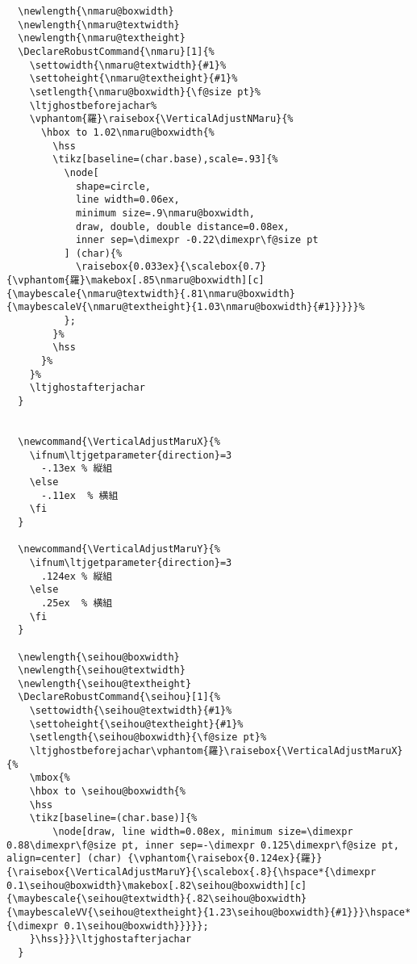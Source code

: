 \documentclass[luatex,fontsize=10pt,paper=b5,twoside]{jlreq}%
\begin{document}
\begin{lstlisting}
  \newlength{\nmaru@boxwidth}
  \newlength{\nmaru@textwidth}
  \newlength{\nmaru@textheight}
  \DeclareRobustCommand{\nmaru}[1]{%
    \settowidth{\nmaru@textwidth}{#1}%
    \settoheight{\nmaru@textheight}{#1}%
    \setlength{\nmaru@boxwidth}{\f@size pt}%
    \ltjghostbeforejachar%
    \vphantom{羅}\raisebox{\VerticalAdjustNMaru}{%
      \hbox to 1.02\nmaru@boxwidth{%
        \hss
        \tikz[baseline=(char.base),scale=.93]{%
          \node[
            shape=circle,
            line width=0.06ex,  
            minimum size=.9\nmaru@boxwidth,  
            draw, double, double distance=0.08ex,
            inner sep=\dimexpr -0.22\dimexpr\f@size pt    
          ] (char){%
            \raisebox{0.033ex}{\scalebox{0.7}{\vphantom{羅}\makebox[.85\nmaru@boxwidth][c]{\maybescale{\nmaru@textwidth}{.81\nmaru@boxwidth}{\maybescaleV{\nmaru@textheight}{1.03\nmaru@boxwidth}{#1}}}}}%
          };
        }%
        \hss
      }%
    }%
    \ltjghostafterjachar
  }


  \newcommand{\VerticalAdjustMaruX}{%
    \ifnum\ltjgetparameter{direction}=3
      -.13ex % 縦組
    \else
      -.11ex  % 横組
    \fi
  }

  \newcommand{\VerticalAdjustMaruY}{%
    \ifnum\ltjgetparameter{direction}=3
      .124ex % 縦組
    \else
      .25ex  % 横組
    \fi
  }

  \newlength{\seihou@boxwidth}
  \newlength{\seihou@textwidth}
  \newlength{\seihou@textheight}
  \DeclareRobustCommand{\seihou}[1]{%
    \settowidth{\seihou@textwidth}{#1}%
    \settoheight{\seihou@textheight}{#1}%
    \setlength{\seihou@boxwidth}{\f@size pt}%
    \ltjghostbeforejachar\vphantom{羅}\raisebox{\VerticalAdjustMaruX}{%
    \mbox{%
    \hbox to \seihou@boxwidth{%
    \hss
    \tikz[baseline=(char.base)]{%
        \node[draw, line width=0.08ex, minimum size=\dimexpr 0.88\dimexpr\f@size pt, inner sep=-\dimexpr 0.125\dimexpr\f@size pt, align=center] (char) {\vphantom{\raisebox{0.124ex}{羅}}{\raisebox{\VerticalAdjustMaruY}{\scalebox{.8}{\hspace*{\dimexpr 0.1\seihou@boxwidth}\makebox[.82\seihou@boxwidth][c]{\maybescale{\seihou@textwidth}{.82\seihou@boxwidth}{\maybescaleVV{\seihou@textheight}{1.23\seihou@boxwidth}{#1}}}\hspace*{\dimexpr 0.1\seihou@boxwidth}}}}};
    }\hss}}}\ltjghostafterjachar
  }


\end{lstlisting}
\end{document}
